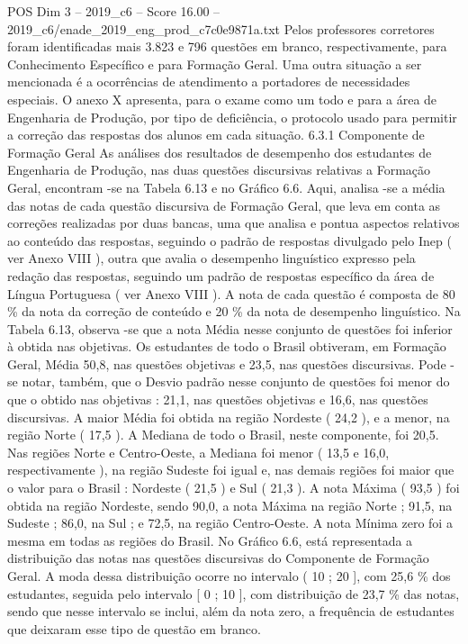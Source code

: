 \begin{textsample}{POS Dim 3 – 2019\_c6 – Score 16.00 – 2019\_c6/enade\_2019\_eng\_prod\_c7c0e9871a.txt}
Pelos professores corretores foram identificadas mais 3.823 e 796 questões em branco, respectivamente, para Conhecimento Específico e para Formação Geral.
Uma outra situação a ser mencionada é a ocorrências de atendimento a portadores de necessidades especiais.
O anexo X apresenta, para o exame como um todo e para a área de Engenharia de Produção, por tipo de deficiência, o protocolo usado para permitir a correção das respostas dos alunos em cada situação. 6.3.1 Componente de Formação Geral As análises dos resultados de desempenho dos estudantes de Engenharia de Produção, nas duas questões discursivas relativas a Formação Geral, encontram -se na Tabela 6.13 e no Gráfico 6.6.
Aqui, analisa -se a média das notas de cada questão discursiva de Formação Geral, que leva em conta as correções realizadas por duas bancas, uma que analisa e pontua aspectos relativos ao conteúdo das respostas, seguindo o padrão de respostas divulgado pelo Inep ( ver Anexo VIII ), outra que avalia o desempenho linguístico expresso pela redação das respostas, seguindo um padrão de respostas específico da área de Língua Portuguesa ( ver Anexo VIII ).
A nota de cada questão é composta de 80 \% da nota da correção de conteúdo e 20 \% da nota de desempenho linguístico.
Na Tabela 6.13, observa -se que a nota Média nesse conjunto de questões foi inferior à obtida nas objetivas.
Os estudantes de todo o Brasil obtiveram, em Formação Geral, Média 50,8, nas questões objetivas e 23,5, nas questões discursivas.
Pode -se notar, também, que o Desvio padrão nesse conjunto de questões foi menor do que o obtido nas objetivas : 21,1, nas questões objetivas e 16,6, nas questões discursivas.
A maior Média foi obtida na região Nordeste ( 24,2 ), e a menor, na região Norte ( 17,5 ).
A Mediana de todo o Brasil, neste componente, foi 20,5.
Nas regiões Norte e Centro-Oeste, a Mediana foi menor ( 13,5 e 16,0, respectivamente ), na região Sudeste foi igual e, nas demais regiões foi maior que o valor para o Brasil : Nordeste ( 21,5 ) e Sul ( 21,3 ).
A nota Máxima ( 93,5 ) foi obtida na região Nordeste, sendo 90,0, a nota Máxima na região Norte ; 91,5, na Sudeste ; 86,0, na Sul ; e 72,5, na região Centro-Oeste.
A nota Mínima zero foi a mesma em todas as regiões do Brasil.
No Gráfico 6.6, está representada a distribuição das notas nas questões discursivas do Componente de Formação Geral.
A moda dessa distribuição ocorre no intervalo ( 10 ; 20 ], com 25,6 \% dos estudantes, seguida pelo intervalo [ 0 ; 10 ], com distribuição de 23,7 \% das notas, sendo que nesse intervalo se inclui, além da nota zero, a frequência de estudantes que deixaram esse tipo de questão em branco.

\end{textsample}
